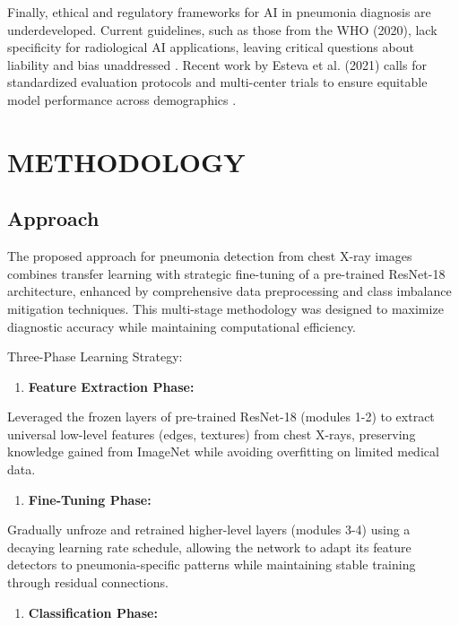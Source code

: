 \documentclass[
  twocolumn,
  10pt,
  a4paper,
  journal
]{IEEEtran}
\begin{document}
Finally, ethical and regulatory frameworks for AI in pneumonia diagnosis are underdeveloped. Current guidelines, such as those from the WHO (2020), lack specificity for radiological AI applications, leaving critical questions about liability and bias unaddressed \cite{who2020}. Recent work by Esteva et al. (2021) calls for standardized evaluation protocols and multi-center trials to ensure equitable model performance across demographics \cite{esteva2021}.

\section{METHODOLOGY}

\subsection{Approach}

The proposed approach for pneumonia detection from chest X-ray images combines transfer learning with strategic fine-tuning of a pre-trained ResNet-18 architecture, enhanced by comprehensive data preprocessing and class imbalance mitigation techniques. This multi-stage methodology was designed to maximize diagnostic accuracy while maintaining computational efficiency.

Three-Phase Learning Strategy:

\begin{enumerate}
\def\labelenumi{\roman{enumi}.}
\item
  \textbf{Feature Extraction Phase:}
\end{enumerate}

Leveraged the frozen layers of pre-trained ResNet-18 (modules 1-2) to extract universal low-level features (edges, textures) from chest X-rays, preserving knowledge gained from ImageNet while avoiding overfitting on limited medical data.

\begin{enumerate}
\def\labelenumi{\roman{enumi}.}
\setcounter{enumi}{1}
\item
  \textbf{Fine-Tuning Phase:}
\end{enumerate}

Gradually unfroze and retrained higher-level layers (modules 3-4) using a decaying learning rate schedule, allowing the network to adapt its feature detectors to pneumonia-specific patterns while maintaining stable training through residual connections.

\begin{enumerate}
\def\labelenumi{\roman{enumi}.}
\setcounter{enumi}{2}
\item
  \textbf{Classification Phase:}
\end{enumerate}
\end{document}
